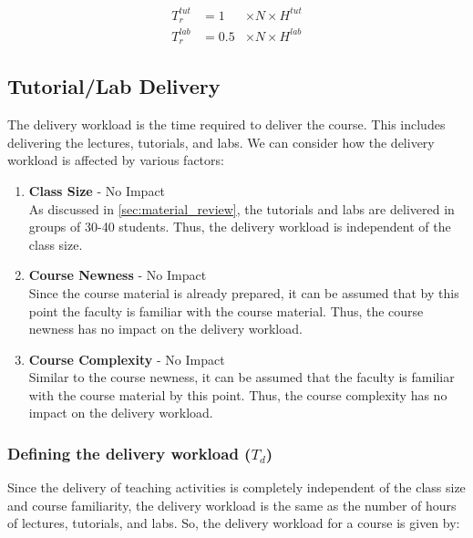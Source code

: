 \begin{equation}
  \label{eqn:review-workload}
  \begin{aligned}
    T_r^{tut} & = 1   & \times N \times H^{tut} \\
    T_r^{lab} & = 0.5 & \times N \times H^{lab}
  \end{aligned}
\end{equation}

\subsection{Tutorial/Lab Delivery}

The delivery workload is the time required to deliver the course. This includes delivering the lectures, tutorials, and labs. We can consider how the delivery workload is affected by various factors:

\begin{enumerate}
  \item \textbf{Class Size} - No Impact \\
        As discussed in \autoref{sec:material_review}, the tutorials and labs are delivered in groups of 30-40 students. Thus, the delivery workload is independent of the class size.

  \item \textbf{Course Newness} - No Impact \\
        Since the course material is already prepared, it can be assumed that by this point the faculty is familiar with the course material. Thus, the course newness has no impact on the delivery workload.

  \item \textbf{Course Complexity} - No Impact \\
        Similar to the course newness, it can be assumed that the faculty is familiar with the course material by this point. Thus, the course complexity has no impact on the delivery workload.

\end{enumerate}

\subsubsection{Defining the delivery workload (\(T_d\))}

Since the delivery of teaching activities is completely independent of the class size and course familiarity, the delivery workload is the same as the number of hours of lectures, tutorials, and labs. So, the delivery workload for a course is given by:

